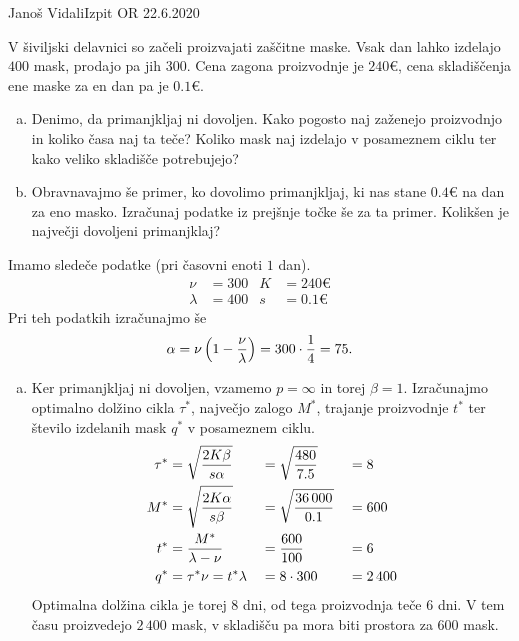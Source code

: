 \begin{naloga}{Janoš Vidali}{Izpit OR 22.6.2020}
\begin{vprasanje}
V šiviljski delavnici so začeli proizvajati zaščitne maske.
Vsak dan lahko izdelajo $400$ mask, prodajo pa jih $300$.
Cena zagona proizvodnje je $240 €$,
cena skladiščenja ene maske za en dan pa je $0.1 €$.

\begin{enumerate}[(a)]
\item Denimo, da primanjkljaj ni dovoljen.
Kako pogosto naj zaženejo proizvodnjo in koliko časa naj ta teče?
Koliko mask naj izdelajo v posameznem ciklu
ter kako veliko skladišče potrebujejo?

\item Obravnavajmo še primer, ko dovolimo primanjkljaj,
ki nas stane $0.4 €$ na dan za eno masko.
Izračunaj podatke iz prejšnje točke še za ta primer.
Kolikšen je največji dovoljeni primanjklaj?
\end{enumerate}
\end{vprasanje}

\begin{odgovor}
Imamo sledeče podatke (pri časovni enoti $1$ dan).
\begin{align*}
\nu &= 300 &
K &= 240 € \\
\lambda &= 400 &
s &= 0.1 €
\end{align*}
Pri teh podatkih izračunajmo še
$$
\alpha = \nu \left(1 - {\nu \over \lambda}\right) = 300 \cdot {1 \over 4} = 75 .
$$

\begin{enumerate}[(a)]
\item Ker primanjkljaj ni dovoljen,
vzamemo $p = \infty$ in torej $\beta = 1$.
Izračunajmo optimalno dolžino cikla $\tau^*$,
največjo zalogo $M^*$, trajanje proizvodnje $t^*$
ter število izdelanih mask $q^*$ v posameznem ciklu.
\begin{alignat*}{3}
\tau^* &= \sqrt{2K \beta \over s \alpha}
&&= \sqrt{480 \over 7.5} &&= 8 \\
M^* &= \sqrt{2K \alpha \over s \beta}
&&= \sqrt{36\,000 \over 0.1} &&= 600 \\
t^* &= {M^* \over \lambda - \nu}
&&= {600 \over 100} &&= 6 \\
q^* &= \tau^* \nu = t^* \lambda
&&= 8 \cdot 300 &&= 2\,400
\end{alignat*}
Optimalna dolžina cikla je torej $8$ dni, od tega proizvodnja teče $6$ dni.
V tem času proizvedejo $2\,400$ mask,
v skladišču pa mora biti prostora za $600$ mask.


\end{enumerate}
\end{odgovor}
\end{naloga}

